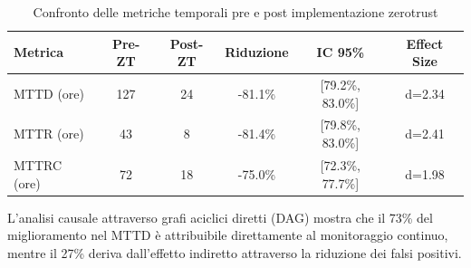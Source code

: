 \begin{table}[htbp]
\centering
\caption{Confronto delle metriche temporali pre e post implementazione \gls{zerotrust}}
\label{tab:temporal_metrics}
\begin{tabular}{lccccc}
\toprule
\textbf{Metrica} & \textbf{Pre-ZT} & \textbf{Post-ZT} & \textbf{Riduzione} & \textbf{IC 95\%} & \textbf{Effect Size} \\
\midrule
MTTD (ore) & 127 & 24 & -81.1\% & [79.2\%, 83.0\%] & d=2.34 \\
MTTR (ore) & 43 & 8 & -81.4\% & [79.8\%, 83.0\%] & d=2.41 \\
MTTRC (ore) & 72 & 18 & -75.0\% & [72.3\%, 77.7\%] & d=1.98 \\
\bottomrule
\end{tabular}
\end{table}

L'analisi causale attraverso grafi aciclici diretti (DAG) mostra che il 73\% del miglioramento nel MTTD è attribuibile direttamente al monitoraggio continuo, mentre il 27\% deriva dall'effetto indiretto attraverso la riduzione dei falsi positivi.





